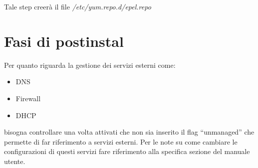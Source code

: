 Tale step creer\`a il file \emph{/etc/yum.repo.d/epel.repo}

\section{Fasi di postinstal}

Per quanto riguarda la gestione dei servizi esterni come:

\begin{itemize}
\item DNS
\item Firewall
\item DHCP
\end{itemize}

bisogna controllare una volta attivati che non sia inserito il flag ``unmanaged'' che permette di far riferimento a servizi esterni.
Per le note su come cambiare le configurazioni di questi servizi fare riferimento alla specifica sezione del manuale utente.

